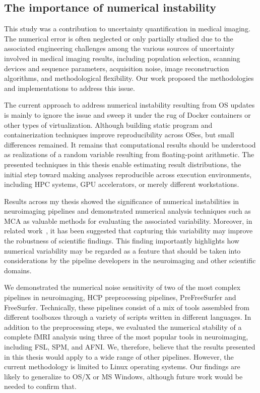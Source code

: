 \subsection{The importance of numerical instability}

This study was a contribution to uncertainty quantification in medical imaging.
The numerical error is often neglected or only partially studied due to the associated engineering challenges among
the various sources of uncertainty involved in medical imaging results, including population selection,
scanning devices and sequence parameters, acquisition noise, image reconstruction algorithms, and methodological flexibility.
Our work proposed the methodologies and implementations to address this issue.

The current approach to address numerical instability resulting from OS
updates is mainly to ignore the issue and sweep it under the rug of %
Docker containers or other types of virtualization. 
Although building static program and containerization techniques improve
reproducibility across OSes, but small differences remained.
It remains that computational results should be understood as realizations of a random variable resulting
from floating-point arithmetic. The presented techniques in this thesis enable estimating
result distributions, the initial step toward making analyses reproducible across
execution environments, including HPC systems, GPU accelerators, or merely
different workstations.

Results across my thesis showed the significance of numerical instabilities in neuroimaging pipelines
and demonstrated numerical analysis techniques such as MCA as valuable methods for evaluating the associated variability. 
Moreover, in related work~\cite{kiar2020numerical}, it has been suggested that capturing this variability may improve the robustness of scientific
findings. This finding importantly highlights how numerical variability may be regarded as a feature that should be
taken into considerations by the pipeline developers in the neuroimaging and other scientific domains.

We demonstrated the numerical noise sensitivity of two of the most complex pipelines in neuroimaging,
HCP preprocessing pipelines, PreFreeSurfer and FreeSurfer. Technically, these pipelines consist of a mix of tools
assembled from different toolboxes through a variety of scripts written in different languages. In addition to the preprocessing steps,
we evaluated the numerical stability of a complete fMRI analysis using three of the most popular tools in neuroimaging, including FSL, SPM, and AFNI.
We, therefore, believe that the results presented in this thesis would apply to a wide range of other pipelines. 
However, the current methodology is limited to Linux operating systems. 
Our findings are likely to generalize to OS/X or MS Windows, although future work would be needed to confirm that.

